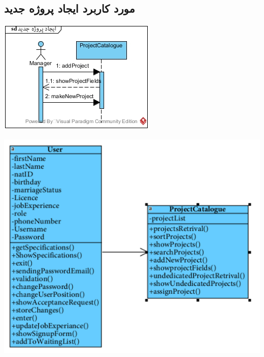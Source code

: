 \subsection*{مورد کاربرد ایجاد پروژه جدید}
\vspace{2cm}
\begin{center}
\includegraphics[width=\textwidth]{SequenceDiagrams/33.jpg}
\end{center}

\newpage
\vspace{2cm}
\begin{center}
\includegraphics[width=\textwidth]{SequenceClasses/33.png}
\end{center}

